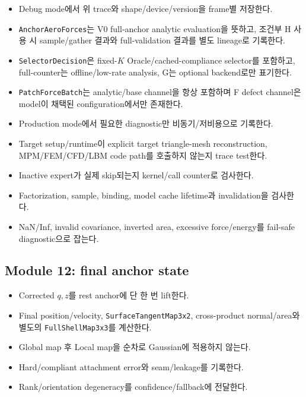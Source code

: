 \documentclass[10pt,a4paper]{article}
\newcommand{\todo}{\textcolor{TodoGray}{\(\square\)}}
\newcommand{\code}[1]{\texttt{#1}}
\begin{document}
\begin{itemize}
  \item[\todo] Debug mode에서 위 trace와 shape/device/version을 frame별 저장한다.
  \item[\todo] \code{AnchorAeroForces}는 V0 full-anchor analytic evaluation을 뜻하고, 조건부 H 사용 시 sample/gather 결과와 full-validation 결과를 별도 lineage로 기록한다.
  \item[\todo] \code{SelectorDecision}은 fixed-\(K\) Oracle/cached-compliance selector를 포함하고, full-counter는 offline/low-rate analysis, G는 optional backend로만 표기한다.
  \item[\todo] \code{PatchForceBatch}는 analytic/base channel을 항상 포함하며 F defect channel은 model이 채택된 configuration에서만 존재한다.
  \item[\todo] Production mode에서 필요한 diagnostic만 비동기/저비용으로 기록한다.
  \item[\todo] Target setup/runtime이 explicit target triangle-mesh reconstruction, MPM/FEM/CFD/LBM code path를 호출하지 않는지 trace test한다.
  \item[\todo] Inactive expert가 실제 skip되는지 kernel/call counter로 검사한다.
  \item[\todo] Factorization, sample, binding, model cache lifetime과 invalidation을 검사한다.
  \item[\todo] NaN/Inf, invalid covariance, inverted area, excessive force/energy를 fail-safe diagnostic으로 잡는다.
\end{itemize}

\subsection*{Module 12: final anchor state}

\begin{itemize}
  \item[\todo] Corrected \(q,z\)를 rest anchor에 단 한 번 lift한다.
  \item[\todo] Final position/velocity, \code{SurfaceTangentMap3x2}, cross-product normal/area와 별도의 \code{FullShellMap3x3}를 계산한다.
  \item[\todo] Global map 후 Local map을 순차로 Gaussian에 적용하지 않는다.
  \item[\todo] Hard/compliant attachment error와 seam/leakage를 기록한다.
  \item[\todo] Rank/orientation degeneracy를 confidence/fallback에 전달한다.
\end{itemize}
\end{document}
